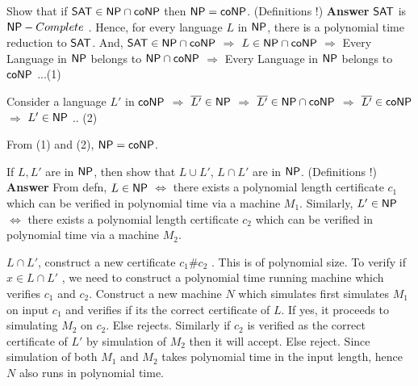 \documentclass[addpoints,12pt]{exam}
\begin{document}
\begin{questions}


\question[5]
Show that if ${\mathsf{SAT}} \in {\ensuremath{\mathsf{NP}}} \cap {\ensuremath{\mathsf{co}}}{\ensuremath{\mathsf{NP}}}$ then ${\mathsf{NP}} = {\mathsf{co}}{\mathsf{NP}}$. (Definitions !) \newline
\textbf{Answer} \newline
${\mathsf{SAT}}$ is ${\mathsf{NP}}-Complete$ . Hence, for every language $L$ in ${\mathsf{NP}}$, there is a polynomial time reduction to ${\mathsf{SAT}}$. And,
${\mathsf{SAT}} \in {\ensuremath{\mathsf{NP}}} \cap {\ensuremath{\mathsf{co}}}{\ensuremath{\mathsf{NP}}}$ $\Longrightarrow$ $L \in {\ensuremath{\mathsf{NP}}} \cap {\ensuremath{\mathsf{co}}}{\ensuremath{\mathsf{NP}}}$ $\Longrightarrow$ Every Language in ${\mathsf{NP}}$ belongs to ${\mathsf{NP}} \cap {\ensuremath{\mathsf{co}}}{\ensuremath{\mathsf{NP}}}$ $\Longrightarrow$ Every Language in ${\mathsf{NP}}$
 belongs to ${\mathsf{co}}{\mathsf{NP}}$ ...(1) \newline
 
 Consider a language $L'$ in ${\mathsf{co}}{\mathsf{NP}}$ $\Longrightarrow$ $\overline{L'} \in {\ensuremath{\mathsf{NP}}}$ $\Longrightarrow$ $\overline{L'} \in {\ensuremath{\mathsf{NP}}} \cap {\ensuremath{\mathsf{co}}}{\ensuremath{\mathsf{NP}}}$
 $\Longrightarrow$ $\overline{L'} \in {\ensuremath{\mathsf{co}}}{\ensuremath{\mathsf{NP}}}$ $\Longrightarrow$ $L' \in {\ensuremath{\mathsf{NP}}}$ .. (2)
 
 From (1) and (2), ${\mathsf{NP}} = {\mathsf{co}}{\mathsf{NP}}$.


\question[5]
If $L, L'$ are in ${\mathsf{NP}}$, then show that $L \cup L'$, $L \cap L'$ are in ${\mathsf{NP}}$. (Definitions !) \newline
\textbf{Answer} \newline
From defn, $L \in {\ensuremath{\mathsf{NP}}}$ $\Leftrightarrow$ there exists a polynomial length certificate $c_{1}$ which can be verified in polynomial time via a machine $M_{1}$. \newline
Similarly, $L' \in {\ensuremath{\mathsf{NP}}}$ $\Leftrightarrow$ there exists a polynomial length certificate $c_{2}$ which can be verified in polynomial time via a machine $M_{2}$. \newline

$L \cap L'$, construct a new certificate $c_{1}\#c_{2}$ . This is of polynomial size. To verify if $x \in L \cap L'$ , we need to construct a polynomial time running machine
which verifies $c_{1}$ and $c_{2}$. Construct a new machine $N$ which simulates first simulates $M_{1}$ on input $c_{1}$ and verifies if its the correct certificate of $L$.
If yes, it proceeds to simulating $M_{2}$ on $c_{2}$. Else rejects. Similarly if $c_{2}$ is verified as the correct certificate of $L'$ by simulation of $M_{2}$ then it will accept. Else reject.
Since simulation of both $M_{1}$ and $M_{2}$ takes polynomial time in the input length, hence $N$ also runs in polynomial time. \newline


\end{questions}
\end{document}

